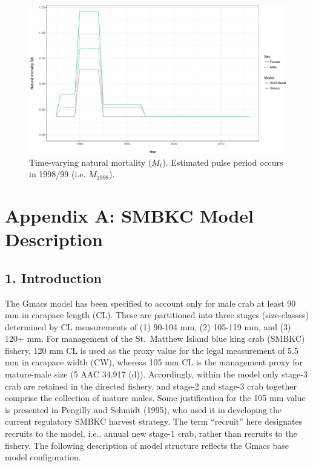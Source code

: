 \documentclass[]{article}
\begin{document}
\begin{figure}[htbp]
\centering
\includegraphics{bbrkc_files/figure-latex/natural_mortality-1.pdf}
\caption{Time-varying natural mortality (\(M_t\)). Estimated pulse
period occurs in 1998/99 (i.e. \(M_{1998}\)). \label{fig:M_t}}
\end{figure}

\newpage

\clearpage

\section{Appendix A: SMBKC Model
Description}\label{appendix-a-smbkc-model-description}

\subsection{1. Introduction}\label{introduction}

The Gmacs model has been specified to account only for male crab at
least 90 mm in carapace length (CL). These are partitioned into three
stages (size-classes) determined by CL measurements of (1) 90-104 mm,
(2) 105-119 mm, and (3) 120+ mm. For management of the St.~Matthew
Island blue king crab (SMBKC) fishery, 120 mm CL is used as the proxy
value for the legal measurement of 5.5 mm in carapace width (CW),
whereas 105 mm CL is the management proxy for mature-male size (5 AAC
34.917 (d)). Accordingly, within the model only stage-3 crab are
retained in the directed fishery, and stage-2 and stage-3 crab together
comprise the collection of mature males. Some justification for the 105
mm value is presented in Pengilly and Schmidt (1995), who used it in
developing the current regulatory SMBKC harvest strategy. The term
``recruit'' here designates recruits to the model, i.e., annual new
stage-1 crab, rather than recruits to the fishery. The following
description of model structure reflects the Gmacs base model
configuration.
\end{document}
